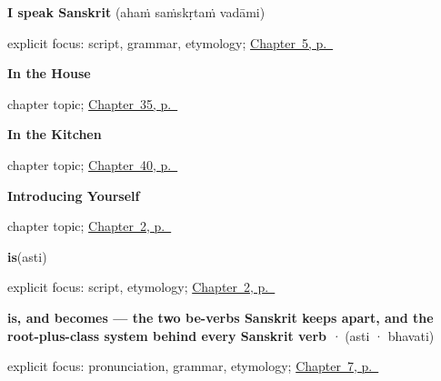 \noindent\begin{minipage}[t]{\linewidth}
\raggedright
\textbf{I speak Sanskrit}\enspace\emph{  }\enspace(ahaṁ saṁskṛtaṁ vadāmi)\par
\footnotesize explicit focus: script, grammar, etymology; \hyperref[ch:first-verbs]{Chapter~5, p.~\pageref*{ch:first-verbs}}
\end{minipage}\par\smallskip

\noindent\begin{minipage}[t]{\linewidth}
\raggedright
\textbf{In the House}\par
\footnotesize chapter topic; \hyperref[ch:sa-house]{Chapter~35, p.~\pageref*{ch:sa-house}}
\end{minipage}\par\smallskip

\noindent\begin{minipage}[t]{\linewidth}
\raggedright
\textbf{In the Kitchen}\par
\footnotesize chapter topic; \hyperref[ch:sa-in-the-kitchen]{Chapter~40, p.~\pageref*{ch:sa-in-the-kitchen}}
\end{minipage}\par\smallskip

\noindent\begin{minipage}[t]{\linewidth}
\raggedright
\textbf{Introducing Yourself}\par
\footnotesize chapter topic; \hyperref[ch:introductions]{Chapter~2, p.~\pageref*{ch:introductions}}
\end{minipage}\par\smallskip

\noindent\begin{minipage}[t]{\linewidth}
\raggedright
\textbf{is}\enspace\emph{}\enspace(asti)\par
\footnotesize explicit focus: script, etymology; \hyperref[ch:introductions]{Chapter~2, p.~\pageref*{ch:introductions}}
\end{minipage}\par\smallskip

\noindent\begin{minipage}[t]{\linewidth}
\raggedright
\textbf{is, and becomes — the two be-verbs Sanskrit keeps apart, and the root-plus-class system behind every Sanskrit verb}\enspace\emph{ · }\enspace(asti · bhavati)\par
\footnotesize explicit focus: pronunciation, grammar, etymology; \hyperref[ch:sa-core-verbs]{Chapter~7, p.~\pageref*{ch:sa-core-verbs}}
\end{minipage}\par\smallskip

